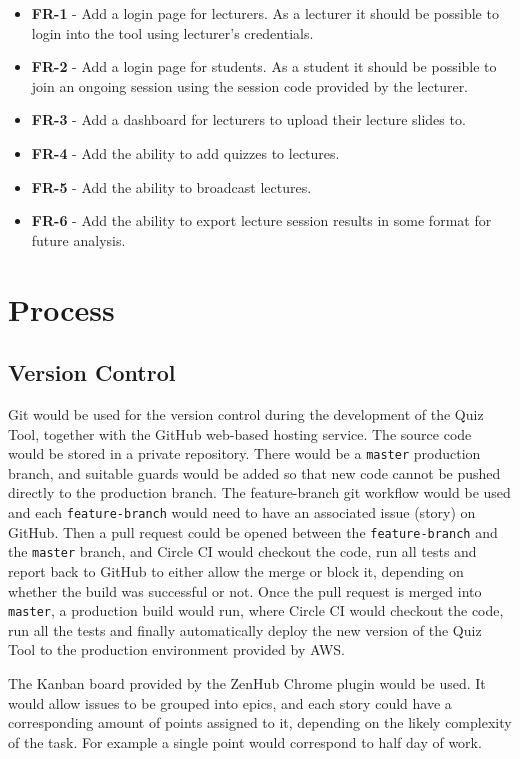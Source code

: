 \begin{itemize}
  \item \textbf{FR-1} - Add a login page for lecturers. As a lecturer it should be possible to login
  into the tool using lecturer's credentials.
  \item \textbf{FR-2} - Add a login page for students. As a student it should be possible to join
  an ongoing session using the session code provided by the lecturer.
  \item \textbf{FR-3} - Add a dashboard for lecturers to upload their lecture slides to.
  \item \textbf{FR-4} - Add the ability to add quizzes to lectures.
  \item \textbf{FR-5} - Add the ability to broadcast lectures.
  \item \textbf{FR-6} - Add the ability to export lecture session results in some format
  for future analysis.
\end{itemize}

\section{Process}
\subsection{Version Control}
Git\cite{29} would be used for the version control during the development of the Quiz Tool, together with
the GitHub\cite{30} web-based hosting service. The source code would be stored in a private
repository. There would be a \texttt{master} production branch, and suitable guards would be added
so that new code cannot be pushed directly to the production branch. The feature-branch git
workflow\cite{31} would be used and each \texttt{feature-branch} would need to have an associated issue
(story) on GitHub. Then a pull request could be opened between the \texttt{feature-branch} and the \texttt{master}
branch, and Circle CI would checkout the code, run all tests and report back to GitHub to either
allow the merge or block it, depending on whether the build was successful or not. Once the pull request
is merged into \texttt{master}, a production build would run, where Circle CI would checkout the code, run
all the tests and finally automatically deploy the new version of the Quiz Tool to the production
environment provided by AWS.

The Kanban board provided by the ZenHub Chrome plugin\cite{32} would be used. It would allow issues to be grouped
into epics, and each story could have a corresponding amount of points assigned to it, depending
on the likely complexity of the task. For example a single point would correspond to half day of work.

